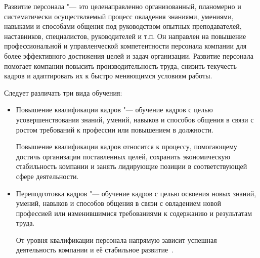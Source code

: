 \documentclass{../industrial-development}
\begin{document}
\lecturenotes

Развитие персонала "--- это целенаправленно организованный, планомерно и систематически осуществляемый процесс овладения знаниями, умениями, навыками и способами общения под руководством опытных преподавателей, наставников, специалистов, руководителей и т.п. Он направлен на повышение профессиональной и управленческой компетентности персонала компании для более эффективного достижения целей и задач организации. Развитие персонала помогает компании повысить производительность труда, снизить текучесть кадров и адаптировать их к быстро меняющимся условиям работы. 

Следует различать три вида обучения:
\begin{itemize}
\item	\alert{Повышение квалификации кадров} "---  обучение кадров с целью усовершенствования знаний, умений, навыков и способов общения в связи с ростом требований к профессии или повышением в должности. 

Повышение квалификации кадров относится к процессу, помогающему достичь организации поставленных целей, сохранить экономическую стабильность компании и занять лидирующие позиции в соответствующей сфере деятельности.

\item	\alert{Переподготовка кадров} "--- обучение кадров с целью освоения новых знаний, умений, навыков и способов общения в связи с овладением новой профессией или изменившимися требованиями к содержанию и результатам труда. 

От уровня квалификации персонала напрямую зависит успешная деятельность компании и её стабильное развитие~\cite[с.~411]{Kibanov}.
  \end{itemize}
\end{document}
